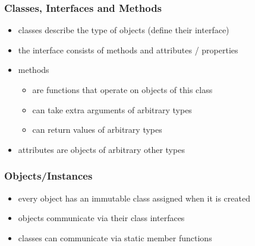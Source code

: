 \documentclass[UTF8]{beamer}
\begin{document}
\begin{frame}
  \frametitle{Classes, Interfaces and Methods}

  \begin{itemize}
    \item \alert{classes} describe the type of objects (define their \alert{interface})
    \item the interface consists of \alert{methods} and \alert{attributes} / properties
    \item methods
      \begin{itemize}
      \item are functions that operate on objects of this class
      \item can take extra arguments of arbitrary types
      \item can return values of arbitrary types
      \end{itemize}
    \item attributes are objects of arbitrary other types
  \end{itemize}
\end{frame}

\begin{frame}
  \frametitle{Objects/Instances}

  \begin{center}
  \end{center}

  \begin{itemize}
    \item every object has an immutable class assigned when it is created
    \item objects communicate via their class interfaces
    \item classes can communicate  via static member functions
  \end{itemize}
\end{frame}
\end{document}
